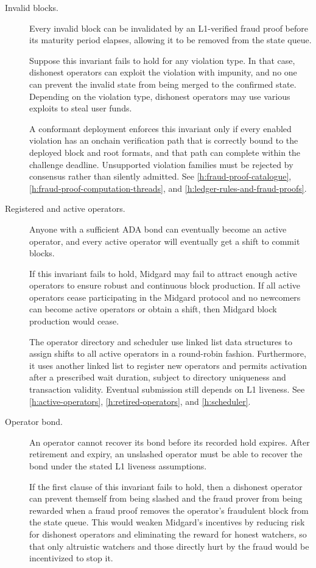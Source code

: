 \documentclass[../midgard.tex]{subfiles}
\begin{document}
\begin{description}
  \item[Invalid blocks.] Every invalid block can be invalidated by an L1-verified fraud proof before its maturity period elapses, allowing it to be removed from the state queue.

    Suppose this invariant fails to hold for any violation type. In that case, dishonest operators can exploit the violation with impunity, and no one can prevent the invalid state from being merged to the confirmed state.
    Depending on the violation type, dishonest operators may use various exploits to steal user funds.

    A conformant deployment enforces this invariant only if every enabled violation has an onchain verification path that is correctly bound to the deployed block and root formats, and that path can complete within the challenge deadline.
    Unsupported violation families must be rejected by consensus rather than silently admitted.
    See \cref{h:fraud-proof-catalogue}, \cref{h:fraud-proof-computation-threads}, and \cref{h:ledger-rules-and-fraud-proofs}.

  \item[Registered and active operators.] Anyone with a sufficient ADA bond can eventually become an active operator, and every active operator will eventually get a shift to commit blocks.

    If this invariant fails to hold, Midgard may fail to attract enough active operators to ensure robust and continuous block production.
    If all active operators cease participating in the Midgard protocol and no newcomers can become active operators or obtain a shift, then Midgard block production would cease.

    The operator directory and scheduler use linked list data structures to assign shifts to all active operators in a round-robin fashion.
    Furthermore, it uses another linked list to register new operators and permits activation after a prescribed wait duration, subject to directory uniqueness and transaction validity. Eventual submission still depends on L1 liveness.
    See \cref{h:active-operators}, \cref{h:retired-operators}, and \cref{h:scheduler}.

  \item[Operator bond.] An operator cannot recover its bond before its recorded hold expires. After retirement and expiry, an unslashed operator must be able to recover the bond under the stated L1 liveness assumptions.

    If the first clause of this invariant fails to hold, then a dishonest operator can prevent themself from being slashed and the fraud prover from being rewarded when a fraud proof removes the operator's fraudulent block from the state queue.
    This would weaken Midgard's incentives by reducing risk for dishonest operators and eliminating the reward for honest watchers, so that only altruistic watchers and those directly hurt by the fraud would be incentivized to stop it.


\end{description}
\end{document}

